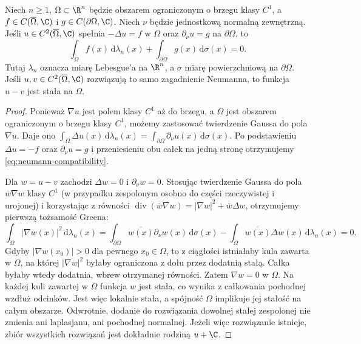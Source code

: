 \begin{stwierdzenie}
Niech $n\geq1$, $\Omega\subset\R^n$ będzie obszarem ograniczonym
o brzegu klasy $C^1$, a $f\in C(\overline\Omega,\C)$ i
$g\in C(\partial\Omega,\C)$. Niech $\nu$ będzie jednostkową
normalną zewnętrzną. Jeśli $u\in C^2(\overline\Omega,\C)$ spełnia
$-\Delta u=f$ w $\Omega$ oraz $\partial_\nu u=g$
na $\partial\Omega$, to
\begin{equation}\label{eq:neumann-compatibility}
 \int_\Omega f(x)\,\mathrm d\lambda_n(x)
 +\int_{\partial\Omega}g(x)\,\mathrm d\sigma(x)=0.
\end{equation}
Tutaj $\lambda_n$ oznacza miarę Lebesgue'a na $\R^n$,
a $\sigma$ miarę powierzchniową na $\partial\Omega$.
Jeśli $u,v\in C^2(\overline\Omega,\C)$ rozwiązują to samo
zagadnienie Neumanna, to funkcja $u-v$ jest stała na $\Omega$.
\end{stwierdzenie}
\begin{proof}
Ponieważ $\nabla u$ jest polem klasy $C^1$ aż do brzegu,
a $\Omega$ jest obszarem ograniczonym o brzegu klasy $C^1$,
możemy zastosować twierdzenie Gaussa do pola $\nabla u$.
Daje ono
$\int_\Omega\Delta u(x)\,\mathrm d\lambda_n(x)
=\int_{\partial\Omega}\partial_\nu u(x)\,\mathrm d\sigma(x)$.
Po podstawieniu $\Delta u=-f$ oraz $\partial_\nu u=g$
i przeniesieniu obu całek na jedną stronę otrzymujemy
\eqref{eq:neumann-compatibility}.

Dla $w=u-v$ zachodzi $\Delta w=0$ i $\partial_\nu w=0$.
Stosując twierdzenie Gaussa do pola $\overline w\nabla w$ klasy $C^1$
(w przypadku zespolonym osobno do części rzeczywistej i urojonej)
i korzystając z równości
$\operatorname{div}(\overline w\nabla w)=|\nabla w|^2+\overline w\Delta w$,
otrzymujemy pierwszą tożsamość Greena:
\[
 \int_\Omega|\nabla w(x)|^2\,\mathrm d\lambda_n(x)
 =\int_{\partial\Omega}\overline{w(x)}\partial_\nu w(x)\,
 \mathrm d\sigma(x)
 -\int_\Omega\overline{w(x)}\Delta w(x)\,\mathrm d\lambda_n(x)=0.
\]
Gdyby $|\nabla w(x_0)|>0$ dla pewnego $x_0\in\Omega$,
to z ciągłości istniałaby kula zawarta w $\Omega$, na której
$|\nabla w|^2$ byłaby ograniczona z dołu przez dodatnią stałą.
Całka byłaby wtedy dodatnia, wbrew otrzymanej równości.
Zatem $\nabla w=0$ w $\Omega$. Na każdej kuli zawartej
w $\Omega$ funkcja $w$ jest stała, co wynika z całkowania
pochodnej wzdłuż odcinków. Jest więc lokalnie stała,
a spójność $\Omega$ implikuje jej stałość na całym obszarze.
Odwrotnie, dodanie do rozwiązania dowolnej stałej zespolonej
nie zmienia ani laplasjanu, ani pochodnej normalnej.
Jeżeli więc rozwiązanie istnieje, zbiór wszystkich rozwiązań
jest dokładnie rodziną $u+\C$.
\end{proof}

